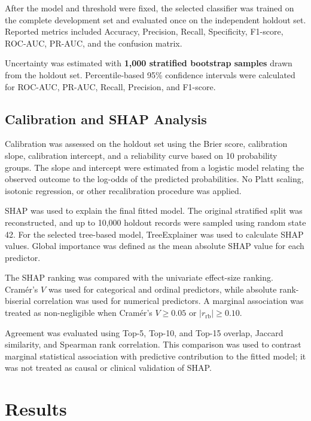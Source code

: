 \documentclass[pdflatex,sn-basic,Numbered]{sn-jnl}
\begin{document}
After the model and threshold were fixed, the selected classifier was
trained on the complete development set and evaluated once on the
independent holdout set.
Reported metrics included Accuracy, Precision, Recall, Specificity,
F1-score, ROC-AUC, PR-AUC, and the confusion matrix.

Uncertainty was estimated with
\textbf{1,000 stratified bootstrap samples} drawn from the holdout set.
Percentile-based 95\% confidence intervals were calculated for ROC-AUC,
PR-AUC, Recall, Precision, and F1-score.


\subsection{Calibration and SHAP Analysis}
\label{subsec:calibration_shap}

Calibration was assessed on the holdout set using the Brier score,
calibration slope, calibration intercept, and a reliability curve based on
10 probability groups.
The slope and intercept were estimated from a logistic model relating the
observed outcome to the log-odds of the predicted probabilities.
No Platt scaling, isotonic regression, or other recalibration procedure was
applied.

SHAP was used to explain the final fitted model.
The original stratified split was reconstructed, and up to 10,000 holdout
records were sampled using random state 42.
For the selected tree-based model, TreeExplainer was used to calculate SHAP
values.
Global importance was defined as the mean absolute SHAP value for each
predictor.

The SHAP ranking was compared with the univariate effect-size ranking.
Cram{\'e}r's $V$ was used for categorical and ordinal predictors, while
absolute rank-biserial correlation was used for numerical predictors.
A marginal association was treated as non-negligible when
Cram{\'e}r's $V\geq0.05$ or
$|r_{\mathrm{rb}}|\geq0.10$.

Agreement was evaluated using Top-5, Top-10, and Top-15 overlap,
Jaccard similarity, and Spearman rank correlation.
This comparison was used to contrast marginal statistical association with
predictive contribution to the fitted model; it was not treated as causal
or clinical validation of SHAP.



\section{Results}\label{sec:results}
\end{document}
